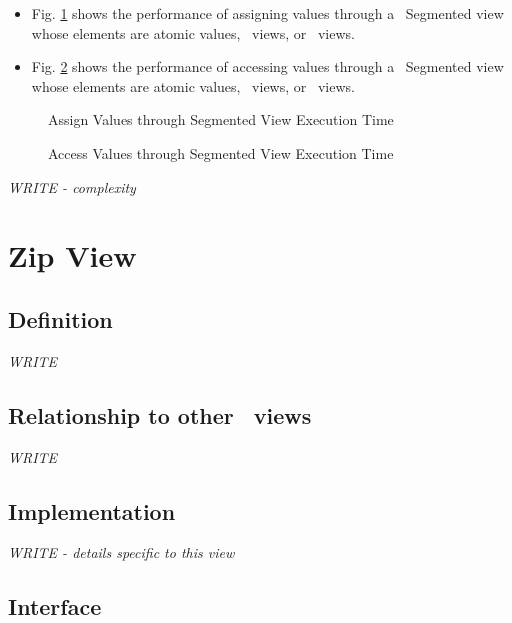\begin{itemize}
\item
Fig. \ref{fig:seg-vw-assign-exper}
shows the performance of assigning values through a \stapl\ Segmented view
whose elements are atomic values, \stl\ views, or \stapl\ views.
\item
Fig. \ref{fig:seg-vw-access-exper}
shows the performance of accessing values through a \stapl\ Segmented view
whose elements are atomic values, \stl\ views, or \stapl\ views.
\end{itemize}

\begin{figure}[p]
\caption{Assign Values through Segmented View Execution Time}
\label{fig:seg-vw-assign-exper}
\end{figure}

\begin{figure}[p]
\caption{Access Values through Segmented View Execution Time}
\label{fig:seg-vw-access-exper}
\end{figure}

\emph{WRITE - complexity}


\section{Zip View} \label{sec-zip-vw}

\subsection{Definition}

\textit{WRITE}

\subsection{Relationship to other \stapl\ views}

\textit{WRITE}

\subsection{Implementation}

\textit{WRITE - details specific to this view}

\subsection{Interface} \label{sec-zip-vw-inter}

